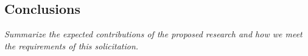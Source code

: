 
\subsection{Conclusions}

{\em Summarize the expected contributions of the proposed research and how we meet the requirements of this solicitation. }



